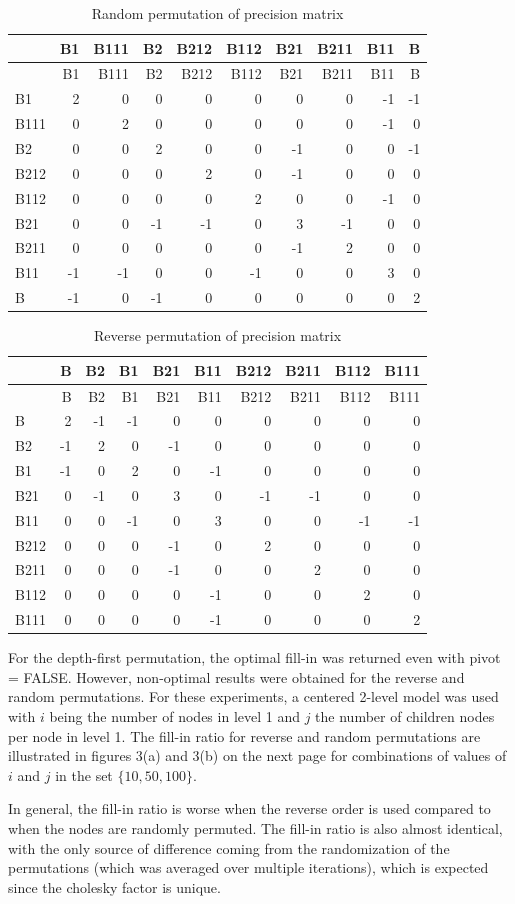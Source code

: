 \documentclass[]{article}
\begin{document}
\begin{longtable}[]{@{}lrrrrrrrrr@{}}
\caption{Random permutation of precision matrix}\tabularnewline
\toprule
& B1 & B111 & B2 & B212 & B112 & B21 & B211 & B11 & B\tabularnewline
\midrule
\endfirsthead
\toprule
& B1 & B111 & B2 & B212 & B112 & B21 & B211 & B11 & B\tabularnewline
\midrule
\endhead
B1 & 2 & 0 & 0 & 0 & 0 & 0 & 0 & -1 & -1\tabularnewline
B111 & 0 & 2 & 0 & 0 & 0 & 0 & 0 & -1 & 0\tabularnewline
B2 & 0 & 0 & 2 & 0 & 0 & -1 & 0 & 0 & -1\tabularnewline
B212 & 0 & 0 & 0 & 2 & 0 & -1 & 0 & 0 & 0\tabularnewline
B112 & 0 & 0 & 0 & 0 & 2 & 0 & 0 & -1 & 0\tabularnewline
B21 & 0 & 0 & -1 & -1 & 0 & 3 & -1 & 0 & 0\tabularnewline
B211 & 0 & 0 & 0 & 0 & 0 & -1 & 2 & 0 & 0\tabularnewline
B11 & -1 & -1 & 0 & 0 & -1 & 0 & 0 & 3 & 0\tabularnewline
B & -1 & 0 & -1 & 0 & 0 & 0 & 0 & 0 & 2\tabularnewline
\bottomrule
\end{longtable}

\begin{longtable}[]{@{}lrrrrrrrrr@{}}
\caption{Reverse permutation of precision matrix}\tabularnewline
\toprule
& B & B2 & B1 & B21 & B11 & B212 & B211 & B112 & B111\tabularnewline
\midrule
\endfirsthead
\toprule
& B & B2 & B1 & B21 & B11 & B212 & B211 & B112 & B111\tabularnewline
\midrule
\endhead
B & 2 & -1 & -1 & 0 & 0 & 0 & 0 & 0 & 0\tabularnewline
B2 & -1 & 2 & 0 & -1 & 0 & 0 & 0 & 0 & 0\tabularnewline
B1 & -1 & 0 & 2 & 0 & -1 & 0 & 0 & 0 & 0\tabularnewline
B21 & 0 & -1 & 0 & 3 & 0 & -1 & -1 & 0 & 0\tabularnewline
B11 & 0 & 0 & -1 & 0 & 3 & 0 & 0 & -1 & -1\tabularnewline
B212 & 0 & 0 & 0 & -1 & 0 & 2 & 0 & 0 & 0\tabularnewline
B211 & 0 & 0 & 0 & -1 & 0 & 0 & 2 & 0 & 0\tabularnewline
B112 & 0 & 0 & 0 & 0 & -1 & 0 & 0 & 2 & 0\tabularnewline
B111 & 0 & 0 & 0 & 0 & -1 & 0 & 0 & 0 & 2\tabularnewline
\bottomrule
\end{longtable}

For the depth-first permutation, the optimal fill-in was returned even
with pivot = FALSE. However, non-optimal results were obtained for the
reverse and random permutations. For these experiments, a centered
2-level model was used with \(i\) being the number of nodes in level 1
and \(j\) the number of children nodes per node in level 1. The fill-in
ratio for reverse and random permutations are illustrated in figures
3(a) and 3(b) on the next page for combinations of values of \(i\) and
\(j\) in the set \(\{10,50,100\}\).

In general, the fill-in ratio is worse when the reverse order is used
compared to when the nodes are randomly permuted. The fill-in ratio is
also almost identical, with the only source of difference coming from
the randomization of the permutations (which was averaged over multiple
iterations), which is expected since the cholesky factor is unique.
\newline \newline
\end{document}
